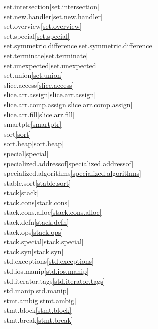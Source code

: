 \begin{multicols}{2}
set.intersection\quad\ref{set.intersection}\\
set.new.handler\quad\ref{set.new.handler}\\
set.overview\quad\ref{set.overview}\\
set.special\quad\ref{set.special}\\
set.symmetric.difference\quad\ref{set.symmetric.difference}\\
set.terminate\quad\ref{set.terminate}\\
set.unexpected\quad\ref{set.unexpected}\\
set.union\quad\ref{set.union}\\
slice.access\quad\ref{slice.access}\\
slice.arr.assign\quad\ref{slice.arr.assign}\\
slice.arr.comp.assign\quad\ref{slice.arr.comp.assign}\\
slice.arr.fill\quad\ref{slice.arr.fill}\\
smartptr\quad\ref{smartptr}\\
sort\quad\ref{sort}\\
sort.heap\quad\ref{sort.heap}\\
special\quad\ref{special}\\
specialized.addressof\quad\ref{specialized.addressof}\\
specialized.algorithms\quad\ref{specialized.algorithms}\\
stable.sort\quad\ref{stable.sort}\\
stack\quad\ref{stack}\\
stack.cons\quad\ref{stack.cons}\\
stack.cons.alloc\quad\ref{stack.cons.alloc}\\
stack.defn\quad\ref{stack.defn}\\
stack.ops\quad\ref{stack.ops}\\
stack.special\quad\ref{stack.special}\\
stack.syn\quad\ref{stack.syn}\\
std.exceptions\quad\ref{std.exceptions}\\
std.ios.manip\quad\ref{std.ios.manip}\\
std.iterator.tags\quad\ref{std.iterator.tags}\\
std.manip\quad\ref{std.manip}\\
stmt.ambig\quad\ref{stmt.ambig}\\
stmt.block\quad\ref{stmt.block}\\
stmt.break\quad\ref{stmt.break}\\

\end{multicols}
